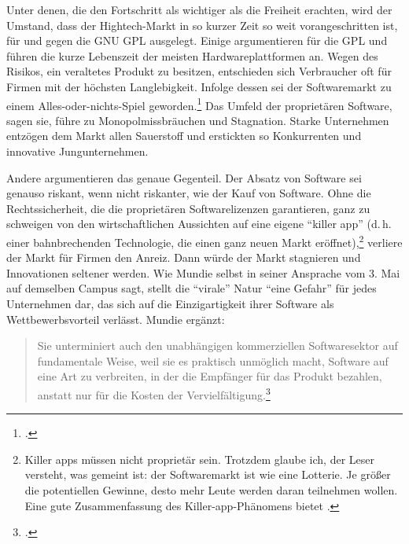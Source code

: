 Unter denen, die den Fortschritt als wichtiger als die Freiheit erachten, wird der Umstand, dass der Hightech-Markt in so kurzer Zeit so weit vorangeschritten ist, für und gegen die GNU GPL ausgelegt. Einige argumentieren für die GPL und führen die kurze Lebenszeit der meisten Hardwareplattformen an. Wegen des Risikos, ein veraltetes Produkt zu besitzen, entschieden sich Verbraucher oft für Firmen mit der höchsten Langlebigkeit. Infolge dessen sei der Softwaremarkt zu einem Alles-oder-nichts-Spiel geworden.\footcite[Vgl.][]{mssrc}
Das Umfeld der proprietären Software, sagen sie, führe zu Monopolmissbräuchen und Stagnation. Starke Unternehmen entzögen dem Markt allen Sauerstoff und erstickten so Konkurrenten und innovative Jungunternehmen. 

Andere argumentieren das genaue Gegenteil. Der Absatz von Software sei genauso riskant, wenn nicht riskanter, wie der Kauf von Software. Ohne die Rechtssicherheit, die die proprietären Softwarelizenzen garantieren, ganz zu schweigen von den wirtschaftlichen Aussichten auf eine eigene "`killer app"' (d.\,h. einer bahnbrechenden Technologie, die einen ganz neuen Markt eröffnet),\footnote{Killer apps müssen nicht proprietär sein. Trotzdem glaube ich, der Leser versteht, was gemeint ist: der Softwaremarkt ist wie eine Lotterie. Je größer die potentiellen Gewinne, desto mehr Leute werden daran teilnehmen wollen. Eine gute Zusammenfassung des Killer-app-Phänomens bietet \cite{killer}.}
verliere der Markt für Firmen den Anreiz. Dann würde der Markt stagnieren und Innovationen seltener werden. Wie Mundie selbst in seiner Ansprache vom 3. Mai auf demselben Campus sagt, stellt die "`virale"' Natur "`eine Gefahr"' für jedes Unternehmen dar, das sich auf die Einzigartigkeit ihrer Software als Wettbewerbsvorteil verlässt. Mundie ergänzt:
\begin{quote}
Sie unterminiert auch den unabhängigen kommerziellen Softwaresektor auf fundamentale Weise, weil sie es praktisch unmöglich macht, Software auf eine Art zu verbreiten, in der die Empfänger für das Produkt bezahlen, anstatt nur für die Kosten der Vervielfältigung.\footcite[Vgl.][]{mundie}
\end{quote}

